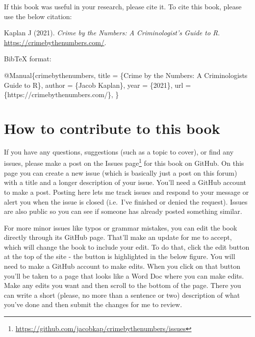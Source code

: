\documentclass[
]{krantz}
\makeatletter
\newenvironment{Shaded}{\begin{snugshade}}{\end{snugshade}}
\newcommand{\DataTypeTok}[1]{\textcolor[rgb]{0.27,0.27,0.27}{#1}}
\newcommand{\NormalTok}[1]{#1}
\newcommand{\OtherTok}[1]{\textcolor[rgb]{0.37,0.37,0.37}{#1}}
\newcommand{\VariableTok}[1]{\textcolor[rgb]{0,0,0}{#1}}
\renewcommand{\href}[2]{#2\footnote{\url{#1}}}
\newenvironment{kframe}{%
\medskip{}
\setlength{\fboxsep}{.8em}
 \def\at@end@of@kframe{}%
 \ifinner\ifhmode%
  \def\at@end@of@kframe{\end{minipage}}%
  \begin{minipage}{\columnwidth}%
 \fi\fi%
 \def\FrameCommand##1{\hskip\@totalleftmargin \hskip-\fboxsep
 \colorbox{shadecolor}{##1}\hskip-\fboxsep
     \hskip-\linewidth \hskip-\@totalleftmargin \hskip\columnwidth}%
 \MakeFramed {\advance\hsize-\width
   \@totalleftmargin\z@ \linewidth\hsize
   \@setminipage}}%
 {\par\unskip\endMakeFramed%
 \at@end@of@kframe}
\renewenvironment{Shaded}{\begin{kframe}}{\end{kframe}}
\makeatother
\begin{document}
If this book was useful in your research, please cite it. To cite this book, please use the below citation:

Kaplan J (2021). \emph{Crime by the Numbers: A Criminologist's Guide to R}. \url{https://crimebythenumbers.com/}.

BibTeX format:

\begin{Shaded}
\begin{Highlighting}[]
\VariableTok{@Manual}\NormalTok{\{}\OtherTok{crimebythenumbers}\NormalTok{,}
  \DataTypeTok{title}\NormalTok{ = \{Crime by the Numbers: A Criminologist\textquotesingle{}s Guide to R\},}
  \DataTypeTok{author}\NormalTok{ = \{Jacob Kaplan\},}
  \DataTypeTok{year}\NormalTok{ = \{2021\},}
  \DataTypeTok{url}\NormalTok{ = \{https://crimebythenumbers.com/\},}
\NormalTok{\}}
\end{Highlighting}
\end{Shaded}

\hypertarget{how-to-contribute-to-this-book}{%
\section{How to contribute to this book}\label{how-to-contribute-to-this-book}}

If you have any questions, suggestions (such as a topic to cover), or find any issues, please make a post on the \href{https://github.com/jacobkap/crimebythenumbers/issues}{Issues page} for this book on GitHub. On this page you can create a new issue (which is basically just a post on this forum) with a title and a longer description of your issue. You'll need a GitHub account to make a post. Posting here lets me track issues and respond to your message or alert you when the issue is closed (i.e.~I've finished or denied the request). Issues are also public so you can see if someone has already posted something similar.

For more minor issues like typos or grammar mistakes, you can edit the book directly through its GitHub page. That'll make an update for me to accept, which will change the book to include your edit. To do that, click the edit button at the top of the site - the button is highlighted in the below figure. You will need to make a GitHub account to make edits. When you click on that button you'll be taken to a page that looks like a Word Doc where you can make edits. Make any edits you want and then scroll to the bottom of the page. There you can write a short (please, no more than a sentence or two) description of what you've done and then submit the changes for me to review.
\end{document}
